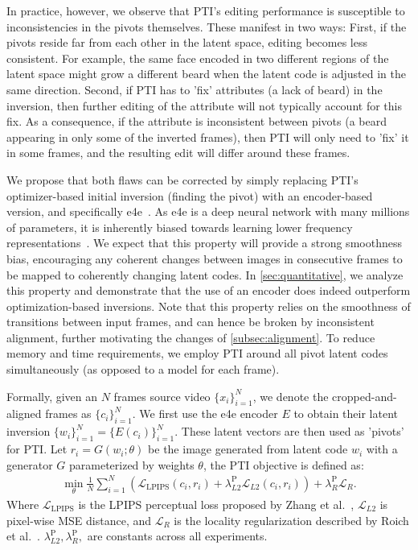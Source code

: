 In practice, however, we observe that PTI's editing performance is susceptible to inconsistencies in the pivots themselves. These manifest in two ways: First, if the pivots reside far from each other in the latent space, editing becomes less consistent. For example, the same face encoded in two different regions of the latent space might grow a different beard when the latent code is adjusted in the same direction. Second, if PTI has to 'fix' attributes (\eg a lack of beard) in the inversion, then further editing of the attribute will not typically account for this fix. As a consequence, if the attribute is inconsistent between pivots (a beard appearing in only some of the inverted frames), then PTI will only need to 'fix' it in some frames, and the resulting edit will differ around these frames.

We propose that both flaws can be corrected by simply replacing PTI's optimizer-based initial inversion (\ie finding the pivot) with an encoder-based version, and specifically e4e~\cite{tov2021designing}. As e4e is a deep neural network with many millions of parameters, it is inherently biased towards learning lower frequency representations~\cite{rahaman2019spectral}. We expect that this property will provide a strong smoothness bias, encouraging any coherent changes between images in consecutive frames to be mapped to coherently changing latent codes. In \cref{sec:quantitative}, we analyze this property and demonstrate that the use of an encoder does indeed outperform optimization-based inversions. Note that this property relies on the smoothness of transitions between input frames, and can hence be broken by inconsistent alignment, further motivating the changes of \cref{subsec:alignment}. To reduce memory and time requirements, we employ PTI around all pivot latent codes simultaneously (as opposed to a model for each frame).


Formally, given an $N$ frames source video $\{x_i\}^N_{i=1}$, we denote the cropped-and-aligned frames as $\{c_i\}^N_{i=1}$. We first use the e4e encoder $E$ to obtain their latent inversion $\{w_i\}^N_{i=1} = \{E(c_i)\}^N_{i=1}$. These latent vectors are then used as 'pivots' for PTI. Let $r_i = G(w_i; \theta)$ be the image generated from latent code $w_i$ with a generator $G$ parameterized by weights $\theta$, the PTI objective is defined as:
{\small
\begin{align}
\underset{\theta}{\min} \frac{1}{N}\sum^{N}_{i=1} ( \mathcal{L}_{\text{LPIPS}}(c_i, r_i) + \lambda^{\text{P}}_{L2}\mathcal{L}_{L2}(c_i, r_i)) + \lambda^{\text{P}}_R \mathcal{L}_{R}.
\end{align}
}
Where $\mathcal{L}_{\text{LPIPS}}$ is the LPIPS perceptual loss proposed by Zhang et al.~, $\mathcal{L}_{L2}$ is pixel-wise MSE distance, and $\mathcal{L}_{R}$ is the locality regularization described by Roich et al.~. $\lambda^{\text{P}}_{L2}, \lambda^{\text{P}}_R, $ are constants across all experiments.


